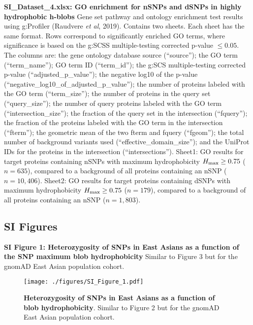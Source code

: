 \documentclass[9pt,lineno]{elife}
\newcommand{\cmax}{H_{\rm max}}
\begin{document}
\textbf{SI_Dataset_4.xlsx: GO enrichment for nSNPs and dSNPs in highly hydrophobic h-blobs} 
Gene set pathway and ontology enrichment test results using g:Profiler (Raudvere {\it et al}, 2019). Contains two sheets. Each sheet has the same format. Rows correspond to significantly enriched GO terms, where significance is based on the g:SCSS multiple-testing corrected p-value $\leq 0.05$. The columns are: the gene ontology database source (``source''); the GO term (``term_name''); GO term ID (``term_id''); the g:SCS multiple-testing corrected p-value (``adjusted_p_value''); the negative log10 of the p-value (``negative_log10_of_adjusted_p_value''); the number of proteins labeled with the GO term (``term_size''); the number of proteins in the query set (``query_size''); the number of query proteins labeled with the GO term (``intersection_size''); the fraction of the query set in the intersection (``fquery''); the fraction of the proteins labeled with the GO term in the intersection (``fterm''); the geometric mean of the two fterm and fquery (``fgeom''); the total number of background variants used (``effective_domain_size''); and the UniProt IDs for the proteins in the intersection (``intersections''). Sheet1: GO results for target proteins containing nSNPs with maximum hydrophobicity $\cmax\geq 0.75$ ($n=635$), compared to a background of all proteins containing an nSNP ($n=10,406$). Sheet2: GO results for target proteins containing dSNPs with maximum hydrophobicity $\cmax\geq 0.75$ ($n=179$), compared to a background of all proteins containing an nSNP ($n=1,803$).  
\hfill

\subsection*{SI Figures}

\textbf{SI Figure 1: Heterozygosity of SNPs in East Asians as a function of the SNP maximum blob hydrophobicity} 
Similar to Figure 3 but for the gnomAD East Asian population cohort.
\hfill

\begin{figure}[!ht]
\texttt{[image: ./figures/SI\_Figure\_1.pdf]}
\caption{{\bf Heterozygosity of SNPs in East Asians as a function of blob hydrophobicity}. Similar to Figure 2 but for the gnomAD East Asian population cohort.}
\label{S1} 
\end{figure}
\clearpage




\end{document}
